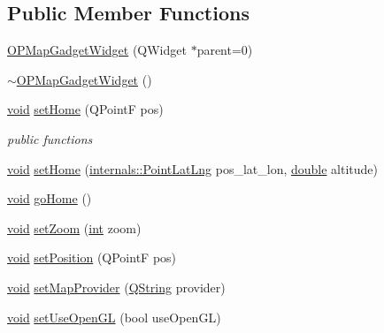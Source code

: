 \subsection*{Public Member Functions}
\begin{DoxyCompactItemize}
\item 
\hyperlink{group___o_p_map_plugin_ga7fe62a2d1a8b920f3e44900dee8d9d5a}{O\-P\-Map\-Gadget\-Widget} (Q\-Widget $\ast$parent=0)
\item 
\hyperlink{group___o_p_map_plugin_ga7c7775d0011bd9d0f8ca0219f48bc193}{$\sim$\-O\-P\-Map\-Gadget\-Widget} ()
\item 
\hyperlink{group___u_a_v_objects_plugin_ga444cf2ff3f0ecbe028adce838d373f5c}{void} \hyperlink{group___o_p_map_plugin_gaea4b659a9476e351373fc6df96026327}{set\-Home} (Q\-Point\-F pos)
\begin{DoxyCompactList}\small\item\em public functions \end{DoxyCompactList}\item 
\hyperlink{group___u_a_v_objects_plugin_ga444cf2ff3f0ecbe028adce838d373f5c}{void} \hyperlink{group___o_p_map_plugin_ga7eaa4b0e19be1df614f49d7b86393a19}{set\-Home} (\hyperlink{structinternals_1_1_point_lat_lng}{internals\-::\-Point\-Lat\-Lng} pos\-\_\-lat\-\_\-lon, \hyperlink{_super_l_u_support_8h_a8956b2b9f49bf918deed98379d159ca7}{double} altitude)
\item 
\hyperlink{group___u_a_v_objects_plugin_ga444cf2ff3f0ecbe028adce838d373f5c}{void} \hyperlink{group___o_p_map_plugin_gab81157189920148cb4178548aeef4b92}{go\-Home} ()
\item 
\hyperlink{group___u_a_v_objects_plugin_ga444cf2ff3f0ecbe028adce838d373f5c}{void} \hyperlink{group___o_p_map_plugin_gaa2731b7fb965c417860b30ac354437ca}{set\-Zoom} (\hyperlink{ioapi_8h_a787fa3cf048117ba7123753c1e74fcd6}{int} zoom)
\item 
\hyperlink{group___u_a_v_objects_plugin_ga444cf2ff3f0ecbe028adce838d373f5c}{void} \hyperlink{group___o_p_map_plugin_ga4c9793fea42fd12ba9f7f27c25f98523}{set\-Position} (Q\-Point\-F pos)
\item 
\hyperlink{group___u_a_v_objects_plugin_ga444cf2ff3f0ecbe028adce838d373f5c}{void} \hyperlink{group___o_p_map_plugin_gab677b7feb42a6edd833e63325d2a928b}{set\-Map\-Provider} (\hyperlink{group___u_a_v_objects_plugin_gab9d252f49c333c94a72f97ce3105a32d}{Q\-String} provider)
\item 
\hyperlink{group___u_a_v_objects_plugin_ga444cf2ff3f0ecbe028adce838d373f5c}{void} \hyperlink{group___o_p_map_plugin_ga98807be867cfbdd8a0eeb05835b63a75}{set\-Use\-Open\-G\-L} (bool use\-Open\-G\-L)

\end{DoxyCompactItemize}

